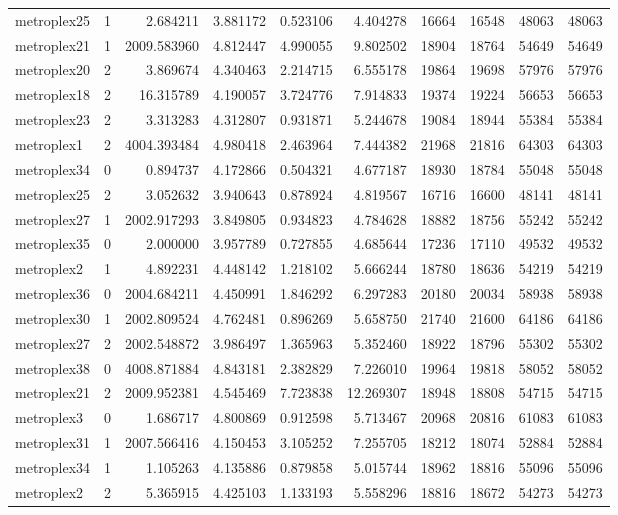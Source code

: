 \begin{longtable}{|l|r|r|r|r|r|r|r|r|r|}
metroplex25 & 1 & 2.684211 & 3.881172 & 0.523106 & 4.404278 & 16664 & 16548 & 48063 & 48063 \\
metroplex21 & 1 & 2009.583960 & 4.812447 & 4.990055 & 9.802502 & 18904 & 18764 & 54649 & 54649 \\
metroplex20 & 2 & 3.869674 & 4.340463 & 2.214715 & 6.555178 & 19864 & 19698 & 57976 & 57976 \\
metroplex18 & 2 & 16.315789 & 4.190057 & 3.724776 & 7.914833 & 19374 & 19224 & 56653 & 56653 \\
metroplex23 & 2 & 3.313283 & 4.312807 & 0.931871 & 5.244678 & 19084 & 18944 & 55384 & 55384 \\
metroplex1 & 2 & 4004.393484 & 4.980418 & 2.463964 & 7.444382 & 21968 & 21816 & 64303 & 64303 \\
metroplex34 & 0 & 0.894737 & 4.172866 & 0.504321 & 4.677187 & 18930 & 18784 & 55048 & 55048 \\
metroplex25 & 2 & 3.052632 & 3.940643 & 0.878924 & 4.819567 & 16716 & 16600 & 48141 & 48141 \\
metroplex27 & 1 & 2002.917293 & 3.849805 & 0.934823 & 4.784628 & 18882 & 18756 & 55242 & 55242 \\
metroplex35 & 0 & 2.000000 & 3.957789 & 0.727855 & 4.685644 & 17236 & 17110 & 49532 & 49532 \\
metroplex2 & 1 & 4.892231 & 4.448142 & 1.218102 & 5.666244 & 18780 & 18636 & 54219 & 54219 \\
metroplex36 & 0 & 2004.684211 & 4.450991 & 1.846292 & 6.297283 & 20180 & 20034 & 58938 & 58938 \\
metroplex30 & 1 & 2002.809524 & 4.762481 & 0.896269 & 5.658750 & 21740 & 21600 & 64186 & 64186 \\
metroplex27 & 2 & 2002.548872 & 3.986497 & 1.365963 & 5.352460 & 18922 & 18796 & 55302 & 55302 \\
metroplex38 & 0 & 4008.871884 & 4.843181 & 2.382829 & 7.226010 & 19964 & 19818 & 58052 & 58052 \\
metroplex21 & 2 & 2009.952381 & 4.545469 & 7.723838 & 12.269307 & 18948 & 18808 & 54715 & 54715 \\
metroplex3 & 0 & 1.686717 & 4.800869 & 0.912598 & 5.713467 & 20968 & 20816 & 61083 & 61083 \\
metroplex31 & 1 & 2007.566416 & 4.150453 & 3.105252 & 7.255705 & 18212 & 18074 & 52884 & 52884 \\
metroplex34 & 1 & 1.105263 & 4.135886 & 0.879858 & 5.015744 & 18962 & 18816 & 55096 & 55096 \\
metroplex2 & 2 & 5.365915 & 4.425103 & 1.133193 & 5.558296 & 18816 & 18672 & 54273 & 54273 \\

\end{longtable}
